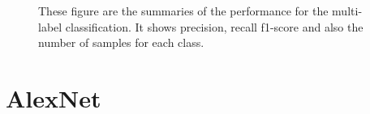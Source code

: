 \begin{figure}
\caption [Performance summary of the Components class trained on Resnet-18]{These figure are the summaries of the performance for the multi-label classification. It shows precision, recall f1-score and also the number of samples for each class.}
\label{fig:perf_res}
\end{figure}



\section{AlexNet}\label{sec:aleX}

